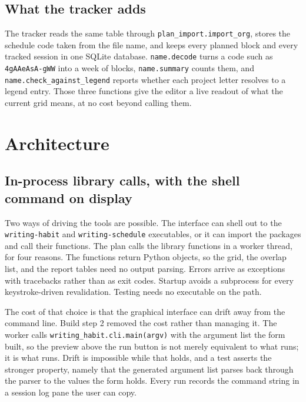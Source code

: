 \documentclass[11pt]{article}
\begin{document}
\subsection{What the tracker adds}
\label{sec:org6f287bd}

The tracker reads the same table through \texttt{plan\_import.import\_org}, stores the
schedule code taken from the file name, and keeps every planned block and every
tracked session in one SQLite database. \texttt{name.decode} turns a code such as
\texttt{4gAAeAsA-gWW} into a week of blocks, \texttt{name.summary} counts them, and
\texttt{name.check\_against\_legend} reports whether each project letter resolves to a
legend entry. Those three functions give the editor a live readout of what the
current grid means, at no cost beyond calling them.
\section{Architecture}
\label{sec:org3fc4470}

\subsection{In-process library calls, with the shell command on display}
\label{sec:org711a2d8}

Two ways of driving the tools are possible. The interface can shell out to the
\texttt{writing-habit} and \texttt{writing-schedule} executables, or it can import the
packages and call their functions. The plan calls the library functions in a
worker thread, for four reasons. The functions return Python objects, so the
grid, the overlap list, and the report tables need no output parsing. Errors
arrive as exceptions with tracebacks rather than as exit codes. Startup avoids
a subprocess for every keystroke-driven revalidation. Testing needs no
executable on the path.

The cost of that choice is that the graphical interface can drift away from the
command line. Build step 2 removed the cost rather than managing it. The worker
calls \texttt{writing\_habit.cli.main(argv)} with the argument list the form built, so
the preview above the run button is not merely equivalent to what runs; it is
what runs. Drift is impossible while that holds, and a test asserts the stronger
property, namely that the generated argument list parses back through the
parser to the values the form holds. Every run records the command string in a
session log pane the user can copy.
\end{document}
